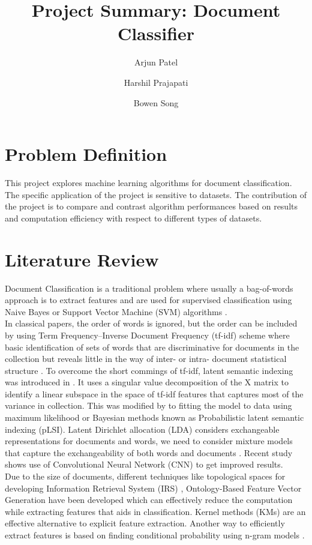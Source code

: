 \documentclass[a4paper, 11pt]{article}
\title{Project Summary: Document Classifier}
\author[1]{Arjun Patel}
\author[1]{Harshil Prajapati}
\author[1]{Bowen Song}
\affil[1]{Department of Electrical and Computer Engineering, Boston University}
\begin{document}
\maketitle
\section{Problem Definition}
This project explores machine learning algorithms for document classification. The specific application of the project is sensitive to datasets. The contribution of the project is to compare and contrast algorithm performances based on results and computation efficiency with respect to different types of datasets.
\section{Literature Review}
 Document Classification is a traditional problem where usually a bag-of-words approach is to extract features and are used for supervised classification using Naive Bayes or Support Vector Machine (SVM) algorithms \cite{sachan2018investigating}. \\


In classical papers, the order of words is ignored, but the order can be included by using Term Frequency–Inverse Document Frequency (tf-idf) scheme where basic identification of sets of words that are discriminative for documents in the collection but reveals little in the way of inter- or intra- document statistical structure \cite{maes1995agents}. To overcome the short commings of tf-idf, latent semantic indexing was introduced in \cite{deerwester1990indexing}. It uses a singular value decomposition of the X matrix to identify a linear subspace in the space of tf-idf features that captures most of the variance in collection. This was modified by \cite{hofmann1999probabilistic} to fitting the model to data using maximum likelihood or Bayesian methods known as Probabilistic latent semantic indexing (pLSI). Latent Dirichlet allocation (LDA) considers exchangeable representations for documents and words, we need to consider mixture models that capture the exchangeability of both words and documents \cite{blei2003latent}. Recent study shows use of Convolutional Neural Network (CNN) \cite{kim2014convolutional} to get improved results. \\

Due to the size of documents, different techniques like topological spaces for developing Information Retrieval System (IRS) \cite{parlak2018feature},  Ontology-Based Feature Vector Generation \cite{elhadad2018novel} have been developed which can effectively reduce the computation while extracting features that aids in classification. Kernel methods (KMs) are an effective alternative to explicit feature extraction. Another way to efficiently extract features is based on finding conditional probability using n-gram models \cite{furnkranz1998study} .\\
\end{document}
